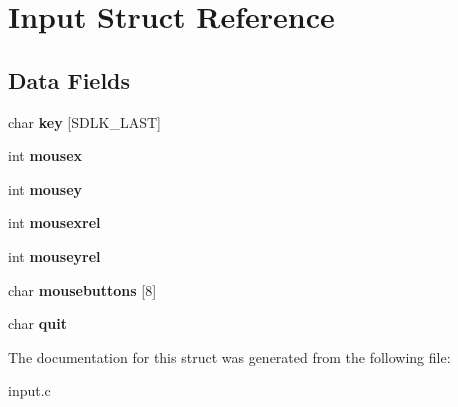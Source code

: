 \hypertarget{structInput}{}\section{Input Struct Reference}
\label{structInput}
\subsection*{Data Fields}
\begin{DoxyCompactItemize}
\item 
char {\bfseries key} \mbox{[}S\+D\+L\+K\+\_\+\+L\+A\+ST\mbox{]}\hypertarget{structInput_a211bceabbcc2ccdd710502d596692ab5}{}\label{structInput_a211bceabbcc2ccdd710502d596692ab5}

\item 
int {\bfseries mousex}\hypertarget{structInput_a332eaea23f6cb9689caaa189b11efef7}{}\label{structInput_a332eaea23f6cb9689caaa189b11efef7}

\item 
int {\bfseries mousey}\hypertarget{structInput_a8ef4889d960150cf103f78639584c73b}{}\label{structInput_a8ef4889d960150cf103f78639584c73b}

\item 
int {\bfseries mousexrel}\hypertarget{structInput_af80e916ff6c3b891d61f39a89ad12aa8}{}\label{structInput_af80e916ff6c3b891d61f39a89ad12aa8}

\item 
int {\bfseries mouseyrel}\hypertarget{structInput_a59f556c09868f3358e3716e5968f9965}{}\label{structInput_a59f556c09868f3358e3716e5968f9965}

\item 
char {\bfseries mousebuttons} \mbox{[}8\mbox{]}\hypertarget{structInput_ade8f5116b1a4c052fd39f50c849a3be6}{}\label{structInput_ade8f5116b1a4c052fd39f50c849a3be6}

\item 
char {\bfseries quit}\hypertarget{structInput_a64fa5d631e4b6f767d8c3dfede7126c3}{}\label{structInput_a64fa5d631e4b6f767d8c3dfede7126c3}

\end{DoxyCompactItemize}


The documentation for this struct was generated from the following file\+:\begin{DoxyCompactItemize}
\item 
input.\+c\end{DoxyCompactItemize}

